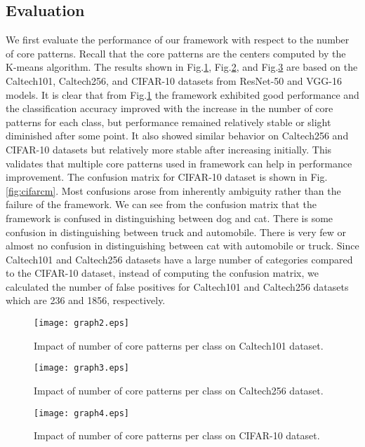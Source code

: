 \documentclass[conference]{IEEEtran}
\begin{document}
\subsection{Evaluation}
We  first evaluate the performance of our  framework with respect to  the number of core patterns. Recall that the core patterns are the centers computed by  the K-means algorithm. The results shown in Fig.\ref{fig:result2}, Fig.\ref{fig:result3}, and Fig.\ref{fig:result4}  are based on the Caltech101, Caltech256, and CIFAR-10 datasets from ResNet-50 and VGG-16 models. It is clear that from Fig.\ref{fig:result2} the  framework exhibited good performance and the classification accuracy improved with the increase in the number of core patterns for each class, but performance remained  relatively stable or  slight diminished after some point. It also showed similar behavior on Caltech256 and CIFAR-10 datasets but  relatively  more stable after increasing initially. This validates that multiple core patterns used in  framework can help in  performance improvement. 
The confusion matrix for CIFAR-10 dataset  is shown in Fig.\ref{fig:cifarcm}.  Most confusions arose from  inherently ambiguity  rather than the failure of the framework. We can see from the confusion matrix that the framework is confused in distinguishing between  dog and cat.  There is some confusion in distinguishing between truck and automobile.  There is very few or almost no confusion in distinguishing between  cat with automobile or truck. Since Caltech101 and Caltech256 datasets have a large number  of categories compared  to  the CIFAR-10 dataset, instead of computing the confusion matrix, we calculated the  number of false positives  for Caltech101 and Caltech256 datasets which are 236 and 1856, respectively.  

\begin{figure}[htbp]
    \centering
    \texttt{[image: graph2.eps]}
    \caption{Impact of number of core patterns per class on Caltech101 dataset.}
    \label{fig:result2}
\end{figure}

\begin{figure}[htbp]
    \centering
    \texttt{[image: graph3.eps]}
    \caption{Impact of number of core patterns per class on Caltech256 dataset.}
    \label{fig:result3}
\end{figure}

\begin{figure}[t!]
    \centering
    \texttt{[image: graph4.eps]}
    \caption{Impact of number of core patterns per class on CIFAR-10 dataset.}
    \label{fig:result4}
\end{figure}
\end{document}
